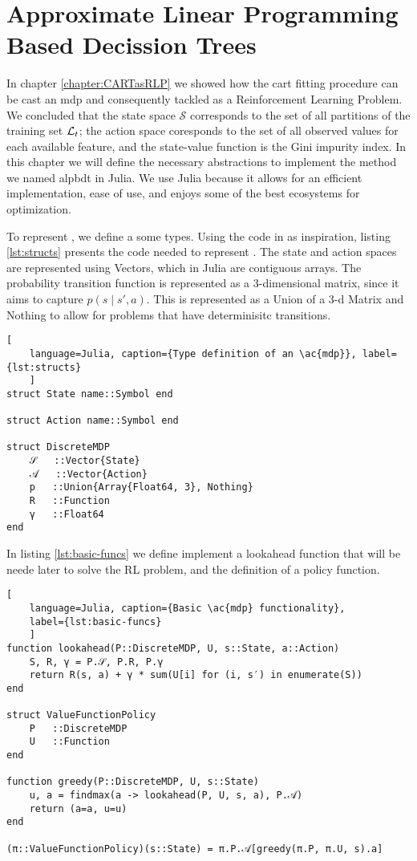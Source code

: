 \chapter{Approximate Linear Programming Based Decission Trees}
\label{chapter:ALPBDT.tex}

In chapter \ref{chapter:CARTasRLP} we showed how the \ac{cart} fitting procedure
can be cast an \ac{mdp} and consequently tackled as a Reinforcement Learning
Problem. We concluded that the state space $\mathcal{S}$ corresponds to the set
of all partitions of the training set $\mathcal{L}_t$; the action space coresponds to the
set of all observed values for each available feature, and the state-value
function is the Gini impurity index. In this chapter we will define the
necessary abstractions to implement the method we named \acf{alpbdt} in Julia.
We use Julia because it allows for an efficient implementation, ease of use, and
enjoys some of the best ecosystems for optimization.

To represent , we define a some types. Using the code in
\cite{kochenderfer2022} as inspiration, listing \ref{lst:structs} presents the
code needed to represent . The state and action spaces are represented
using Vectors, which in Julia are contiguous arrays. The probability transition
function is represented as a 3-dimensional matrix, since it aims to capture $p(s
\mid s', a)$. This is represented as a Union of a 3-d Matrix and Nothing to
allow for problems that have determinisitc transitions.

\begin{lstlisting}[
    language=Julia, caption={Type definition of an \ac{mdp}}, label={lst:structs}
    ]
struct State name::Symbol end

struct Action name::Symbol end

struct DiscreteMDP
    𝒮   ::Vector{State}
    𝒜   ::Vector{Action}
    p   ::Union{Array{Float64, 3}, Nothing}
    R   ::Function
    γ   ::Float64
end
\end{lstlisting}

In listing \ref{lst:basic-funcs} we define implement a lookahead function that
will be neede later to solve the RL problem, and the definition of a policy
function.

\begin{lstlisting}[
    language=Julia, caption={Basic \ac{mdp} functionality},
    label={lst:basic-funcs}
    ]
function lookahead(P::DiscreteMDP, U, s::State, a::Action)
    S, R, γ = P.𝒮, P.R, P.γ
    return R(s, a) + γ * sum(U[i] for (i, s′) in enumerate(S))
end

struct ValueFunctionPolicy
    P   ::DiscreteMDP
    U   ::Function
end

function greedy(P::DiscreteMDP, U, s::State)
    u, a = findmax(a -> lookahead(P, U, s, a), P.𝒜)
    return (a=a, u=u)
end

(π::ValueFunctionPolicy)(s::State) = π.P.𝒜[greedy(π.P, π.U, s).a]
\end{lstlisting}

